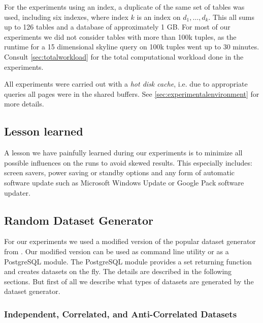 For the experiments using an index, a duplicate of the same set of
tables was used, including six indexes, where index $k$ is an index on
$d_1, \ldots, d_k$.  This all sums up to 126 tables and a database of
approximately 1 GB.  For most of our experiments we did not consider
tables with more than 100k tuples, as the runtime for a 15 dimensional
skyline query on 100k tuples went up to 30 minutes. Consult
\autoref{sec:totalworkload} for the total computational workload
done in the experiments.


All experiments were carried out with a \emph{hot disk cache},
i.e. due to appropriate queries all pages were in the shared
buffers. See \autoref{sec:experimentalenvironment} for more
details.


\subsection{Lesson learned}
\label{sec:lessonlearned}
A lesson we have painfully learned during our experiments is to
minimize all possible influences on the runs to avoid skewed
results. This especially includes: screen savers, power saving or
standby options and any form of automatic software update such as
Microsoft Windows Update or Google Pack software updater.

\subsection{Random Dataset Generator}

For our experiments we used a modified version \citep{Eder2007a} of
the popular dataset generator from \citep{Borzsonyi2001}.  Our
modified version can be used as command line utility or as a
PostgreSQL module. The PostgreSQL module provides a set returning
function and creates datasets on the fly.  The details are described
in the following sections.  But first of all we describe what types of
datasets are generated by the dataset generator.

\subsubsection{Independent, Correlated, and Anti-Correlated Datasets}
\label{sec:corr-anti-indep}

